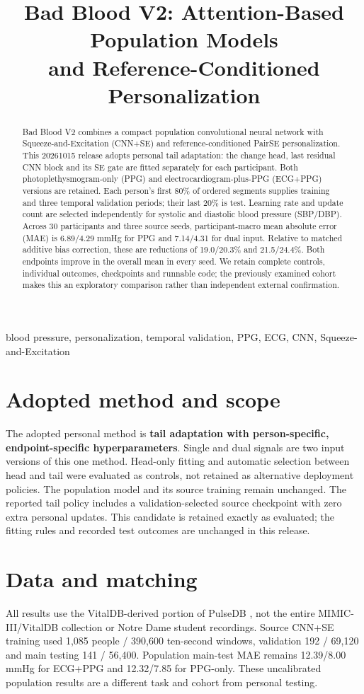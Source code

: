 \documentclass[conference]{IEEEtran}
\title{Bad Blood V2: Attention-Based Population Models\protect\\and Reference-Conditioned Personalization}
\author{\IEEEauthorblockN{Jingyi Guo}
\IEEEauthorblockA{Bad Blood Project, University of Notre Dame\\
Research and Engineering Results Report --- October 15, 2026}}
\begin{document}
\maketitle\thispagestyle{plain}
\begin{abstract}
Bad Blood V2 combines a compact population convolutional neural network with
Squeeze-and-Excitation (CNN+SE) and reference-conditioned PairSE personalization.
This 20261015 release adopts personal tail adaptation: the change head, last
residual CNN block and its SE gate are fitted separately for each participant.
Both photoplethysmogram-only (PPG) and electrocardiogram-plus-PPG (ECG+PPG)
versions are retained. Each person's first 80\% of ordered segments supplies
training and three temporal validation periods; their last 20\% is test.
Learning rate and update count are selected independently for systolic and
diastolic blood pressure (SBP/DBP). Across 30 participants and three source seeds,
participant-macro mean absolute error (MAE) is 6.89/4.29 mmHg for PPG and
7.14/4.31 for dual input. Relative to matched additive bias correction, these
are reductions of 19.0/20.3\% and 21.5/24.4\%. Both endpoints improve in the
overall mean in every seed. We retain complete controls, individual outcomes,
checkpoints and runnable code; the previously examined cohort makes this an
exploratory comparison rather than independent external confirmation.
\end{abstract}
\begin{IEEEkeywords}blood pressure, personalization, temporal validation,
PPG, ECG, CNN, Squeeze-and-Excitation\end{IEEEkeywords}

\section{Adopted method and scope}
The adopted personal method is \textbf{tail adaptation with person-specific,
endpoint-specific hyperparameters}. Single and dual signals are two input
versions of this one method. Head-only fitting and automatic selection between
head and tail were evaluated as controls, not retained as alternative deployment
policies. The population model and its source training remain unchanged.
The reported tail policy includes a validation-selected source checkpoint with
zero extra personal updates. This candidate is retained exactly as evaluated;
the fitting rules and recorded test outcomes are unchanged in this release.

\section{Data and matching}
All results use the VitalDB-derived portion of PulseDB \cite{wang2023pulsedb},
not the entire MIMIC-III/VitalDB collection or Notre Dame student recordings.
Source CNN+SE training used 1,085 people / 390,600 ten-second windows, validation
192 / 69,120 and main testing 141 / 56,400. Population main-test MAE remains
12.39/8.00 mmHg for ECG+PPG and 12.32/7.85 for PPG-only. These uncalibrated
population results are a different task and cohort from personal testing.
\end{document}
